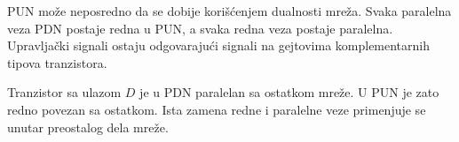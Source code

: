 PUN može neposredno da se dobije korišćenjem dualnosti mreža. Svaka paralelna veza PDN postaje redna u PUN, a svaka redna veza postaje paralelna. Upravljački signali ostaju odgovarajući signali na gejtovima komplementarnih tipova tranzistora.

Tranzistor sa ulazom $D$ je u PDN paralelan sa ostatkom mreže. U PUN je zato redno povezan sa ostatkom. Ista zamena redne i paralelne veze primenjuje se unutar preostalog dela mreže.
